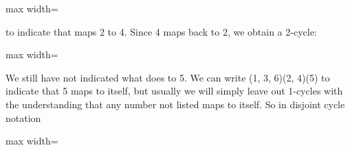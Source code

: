\documentclass[11pt,oneside]{article}
\begin{document}
\begin{BookBody}
\begin{center}\begin{adjustbox}{max width=\linewidth}\end{adjustbox}\end{center}

\noindent to indicate that \BookInline{\sigma } maps 2 to 4. Since 4 maps back to 2, we obtain a 2-cycle:

\begin{center}\begin{adjustbox}{max width=\linewidth}\end{adjustbox}\end{center}

\noindent We still have not indicated what \BookInline{\sigma } does to 5. We can write (1, 3, 6)(2, 4)(5) to indicate that 5 maps to itself, but usually we will simply leave out 1-cycles with the understanding that any number not listed maps to itself. So in disjoint cycle notation

\begin{center}\begin{adjustbox}{max width=\linewidth}\end{adjustbox}\end{center}

\end{BookBody}

\BookNarrativetrue
\end{document}
